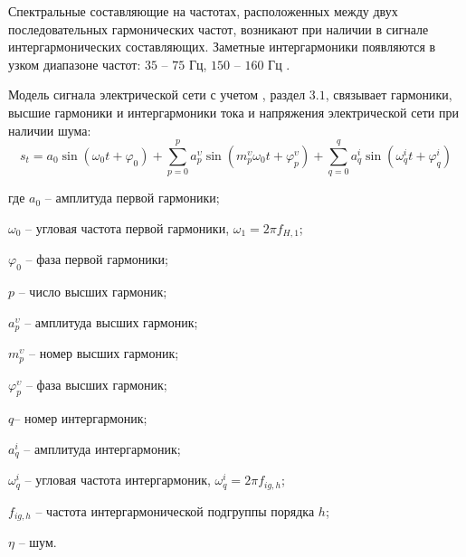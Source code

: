 Спектральные составляющие на частотах, расположенных между двух последовательных гармонических частот, возникают при наличии в сигнале интергармонических составляющих. 
Заметные интергармоники появляются в узком диапазоне частот: $35$ – $75$ Гц, $150$ – $160$ Гц \cite{Interharmonics_in_systems_Zhezhelenko_1999}.
 
Модель сигнала электрической сети с учетом \cite{GOST30804.4.7-2013}, раздел $3.1$, связывает гармоники, высшие гармоники и интергармоники тока и напряжения электрической сети при наличии шума: 
\begin{equation}
	\label{eq:equation6}
		s_{t} = a_{0} \sin (\omega_{0} t + \varphi_{0}) + \displaystyle\sum_{p=0}^{p} a_p^{\upsilon} \sin (m_p^{\upsilon} \omega_{0} t + \varphi_p^{\upsilon}) + \displaystyle\sum_{q=0}^{q} a_q^i \sin  (\omega_q^i t + \varphi_q^{i})
\end{equation}

где $a_{0}$ – амплитуда первой гармоники;

$\omega_{0}$ – угловая частота первой гармоники, $\omega_{1} = 2 \pi f_{H,1}$;

$\varphi_{0}$ – фаза первой гармоники; 

$p$ – число высших гармоник;

$a_p^{\upsilon}$ – амплитуда высших гармоник;

$m_p^{\upsilon}$ – номер высших гармоник;

$\varphi_p^{\upsilon}$ – фаза высших гармоник;

$q$– номер интергармоник;

$a_q^i$ – амплитуда интергармоник;

$\omega_q^i$ – угловая частота интергармоник, $\omega_q^i=2\pi f_{ig,h}$; 

$f_{ig,h}$ – частота интергармонической подгруппы порядка $h$;

$\eta$ – шум.

